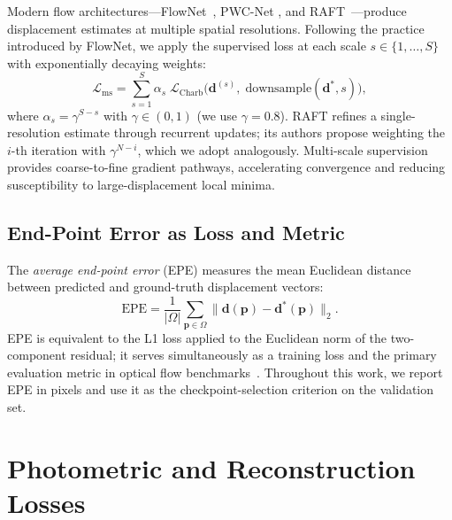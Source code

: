 Modern flow architectures---FlowNet~\cite{dosovitskiy2015flownet}, PWC-Net
\cite{sun2018pwcnet}, and RAFT~\cite{teed2020raft}---produce displacement
estimates at multiple spatial resolutions.  Following the practice introduced
by FlowNet, we apply the supervised loss at each scale $s \in
\{1,\dots,S\}$ with exponentially decaying weights:
%
\begin{equation}
  \mathcal{L}_{\text{ms}}
  = \sum_{s=1}^{S} \alpha_{s}\;
    \mathcal{L}_{\text{Charb}}\!\bigl(
      \mathbf{d}^{(s)},\;\text{downsample}(\mathbf{d}^{*}, s)\bigr),
  \label{eq:multiscale}
\end{equation}
%
where $\alpha_{s} = \gamma^{S-s}$ with $\gamma \in (0,1)$ (we use
$\gamma=0.8$).  RAFT refines a single-resolution estimate through recurrent
updates; its authors propose weighting the $i$-th iteration with
$\gamma^{N-i}$, which we adopt analogously.  Multi-scale supervision
provides coarse-to-fine gradient pathways, accelerating convergence and
reducing susceptibility to large-displacement local minima.

\subsection{End-Point Error as Loss and Metric}
\label{ssec:epe}

The \emph{average end-point error} (EPE) measures the mean Euclidean distance
between predicted and ground-truth displacement vectors:
%
\begin{equation}
  \text{EPE}
  = \frac{1}{|\Omega|}\sum_{\mathbf{p}\in\Omega}
    \lVert \mathbf{d}(\mathbf{p}) - \mathbf{d}^{*}(\mathbf{p}) \rVert_{2}.
  \label{eq:epe}
\end{equation}
%
EPE is equivalent to the L1 loss applied to the Euclidean norm of the
two-component residual; it serves simultaneously as a training loss and the
primary evaluation metric in optical flow
benchmarks~\cite{butler2012sintel}.  Throughout this work, we report EPE in
pixels and use it as the checkpoint-selection criterion on the validation set.


\section{Photometric and Reconstruction Losses}
\label{sec:photometric}

